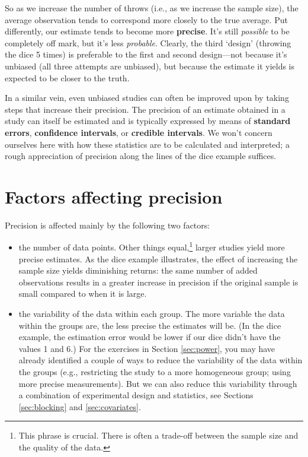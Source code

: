 \documentclass[a4paper]{tufte-book}\usepackage[]{graphicx}\usepackage[]{xcolor}
\begin{document}
\medskip

So as we increase the number of throws (i.e., as we increase the sample size),
the average observation tends to correspond more closely to the true average.
Put differently, our estimate tends to become more \textbf{precise}.
It's still \emph{possible} to be completely off mark, but it's less \emph{probable}.
Clearly, the third `design' (throwing the dice 5 times) is preferable to
the first and second design---not because it's unbiased (all three attempts are
unbiased), but because the estimate it yields is expected to be closer to the
truth.

In a similar vein, even unbiased studies can often be improved upon by taking
steps that increase their precision. 
The precision of an estimate obtained in a study can itself be estimated 
and is typically expressed by means of \textbf{standard errors}, 
\textbf{confidence intervals},
or \textbf{credible intervals}. 
We won't concern ourselves here with how these
statistics are to be calculated and interpreted; 
a rough appreciation of precision along the lines of the dice example suffices.

\section{Factors affecting precision}
Precision is affected mainly by the following two factors:
\begin{itemize}
  \item the number of data points. Other things equal,\footnote{This phrase is crucial. There is often a trade-off between the sample size and the quality of the data.} larger studies
  yield more precise estimates. As the dice example illustrates, the effect
  of increasing the sample size yields diminishing returns:
  the same number of added observations results in a greater increase in precision
  if the original sample is small compared to when it is large.

  \item the variability of the data within each group. The more variable the data
  within the groups are, the less precise the estimates will be.
  (In the dice example, the estimation error would be lower
  if our dice didn't have the values 1 and 6.)
  For the exercises in Section \ref{sec:power}, 
  you may have already identified a couple of ways to reduce the variability of the data within the groups 
  (e.g., restricting the study to a more homogeneous group; 
  using more precise measurements). But we can also
  reduce this variability through a combination of experimental design and
  statistics, see Sections \ref{sec:blocking} and \ref{sec:covariates}.
\end{itemize}
\end{document}
